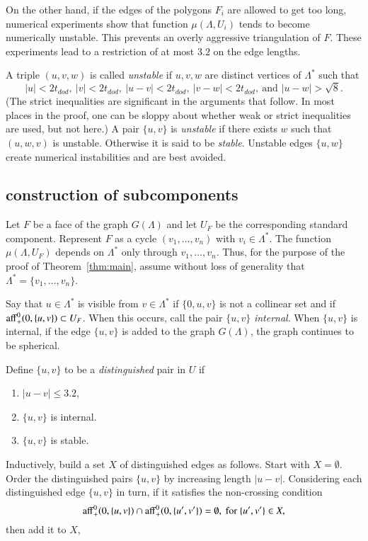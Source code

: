 On the other hand, if the edges of the polygons $F_i$ are allowed
to get too long, numerical experiments show that function $\mu(\Lambda,U_i)$
tends to become numerically unstable.  This prevents 
an overly aggressive  triangulation of $F$.
These experiments lead
 to a restriction of at most $3.2$ on the edge lengths.

A triple $(u,v,w)$ is called {\it unstable}
if $u,v,w$ are distinct vertices of $\Lambda^*$ such
that 
$$
|u| < 2t_{dod},\ |v| < 2 t_{dod},\ |u-v|< 2t_{dod},\  |v-w|< 2t_{dod},\ \text{and } |u-w|>\sqrt8.$$  
(The 
strict inequalities are significant in the arguments that follow.
In most places in the proof, one can be sloppy about whether
weak or strict inequalities are used, but not here.)
A pair $\{u,v\}$ is {\it unstable} if there exists $w$ such that $(u,w,v)$
is unstable.  Otherwise it is said to be {\it stable}.
Unstable edges $\{u,w\}$ create
 numerical instabilities and are best avoided.


\subsection{construction of subcomponents}\label{sec:sub}

Let $F$ be a face of the graph $G(\Lambda)$ and let $U_F$ be the
corresponding standard component.  Represent $F$ as a cycle
$(v_1,\ldots,v_n)$ with $v_i\in\Lambda^*$.  The function
$\mu(\Lambda,U_F)$ depends  on $\Lambda^*$ only through
$v_1,\ldots,v_n$.  Thus, for the purpose of the proof of
Theorem~\ref{thm:main},  assume without loss of generality
that $\Lambda^* = \{v_1,\ldots,v_n\}$.

Say that $u\in\Lambda^*$ is visible from $v\in\Lambda^*$ if
$\{0,u,v\}$ is not a collinear set and if
${\operatorname{aff}}_+^0(0,\{u,v\})\subset U_F$.  When this occurs, 
call the pair $\{u,v\}$ {\it internal}.  When $\{u,v\}$
is  internal, if the edge $\{u,v\}$ is added to the
graph $G(\Lambda)$, the graph continues to be spherical.

Define $\{u,v\}$ to be a {\it distinguished} pair in $U$ if
\begin{enumerate}
\item  $|u-v|\le3.2$, 
\item $\{u,v\}$ is internal.
\item  $\{u,v\}$ is stable.
\end{enumerate}  

Inductively, build a set $X$ of distinguished edges as follows.
Start with $X=\emptyset$.
Order the distinguished pairs $\{u,v\}$ by increasing
length $|u-v|$.  Considering each
distinguished edge $\{u,v\}$ in turn,
if it satisfies
the non-crossing condition
  $$
  {\operatorname{aff}}_+^0(0,\{u,v\}) \cap {\operatorname{aff}}_+^0(0,\{u',v'\}) = \emptyset,
  \text{ for } \{u',v'\}\in X,
$$
then add it to $X$, 



